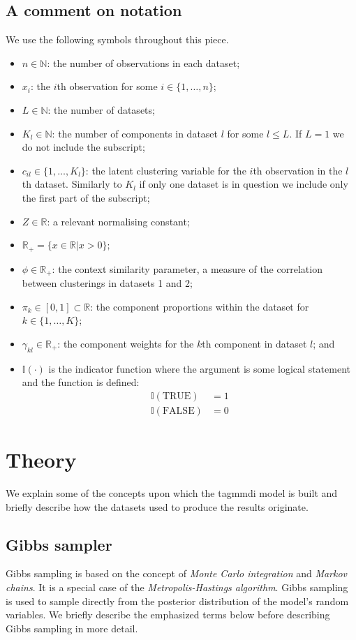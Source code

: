 \documentclass[11pt]{article} %
\begin{document}
\subsection*{A comment on notation}
We use the following symbols throughout this piece.
\begin{itemize}
 \item $n \in \mathbb{N}$: the number of observations in each dataset;
 \item $x_i$: the $i$th observation for some $i \in \{1,\ldots, n\}$;
 \item $L  \in \mathbb{N}$: the number of datasets;
 \item $K_l \in \mathbb{N}$: the number of components in dataset $l$ for some $l \leq L$. If $L = 1$ we do not include the subscript;
 \item $c_{il} \in \{1,\ldots,K_l\}$: the latent clustering variable for the $i$th observation in the $l$th dataset. Similarly to $K_l$ if only one dataset is in question we include only the first part of the subscript;
 \item $Z \in \mathbb{R}$: a relevant normalising constant;
 \item $\mathbb{R}_+ = \{x \in \mathbb{R} | x > 0\};$
 \item $\phi \in \mathbb{R}_+$: the context similarity parameter, a measure of the correlation between clusterings in datasets 1 and 2;
 \item $\pi_k \in [0, 1] \subset \mathbb{R}$: the component proportions within the dataset for $k \in \{1, \ldots, K\}$;
 \item $\gamma_{kl} \in \mathbb{R}_+$: the component weights for the $k$th component in dataset $l$; and
 \item $\mathbb{I}(\cdot)$ is the indicator function where the argument is some logical statement and the function is defined:
 \begin{align}
\mathbb{I}(\text{TRUE}) & = 1 \\
 \mathbb{I}(\text{FALSE}) & = 0
 \end{align}
\end{itemize}

\section{Theory}
We explain some of the concepts upon which the tagmmdi model is built and briefly describe how the datasets used to produce the results originate.
\subsection{Gibbs sampler}
Gibbs sampling is based on the concept of \emph{Monte Carlo integration} and \emph{Markov chains}. It is a special case of the \emph{Metropolis-Hastings algorithm}. Gibbs sampling is used to sample directly from the posterior distribution of the model's random variables. We briefly describe the emphasized terms below before describing Gibbs sampling in more detail.
\end{document}
